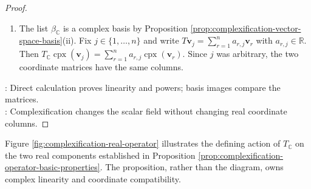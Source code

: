 \begin{proposition}
\begin{proof}
\begin{enumerate}[label=(\roman*)]
Hence $(\forall\,k\in\mathbb{Z}_{\geq0})\,(T_{\mathbb{C}})^k(\mathbf{u}+i\mathbf{v})=T^k\mathbf{u}+iT^k\mathbf{v}$ by induction. Since $\mathbf{u},\mathbf{v}$ were arbitrary, claim (ii) follows.
\item The list $\beta_{\mathbb{C}}$ is a complex basis by Proposition \ref{prop:complexification-vector-space-basis}(ii). Fix $j\in\{1,\ldots,n\}$ and write $T\mathbf{v}_j=\sum\limits_{r=1}^{n}a_{r,j}\mathbf{v}_r$ with $a_{r,j}\in\mathbb{R}$.\\
Then $T_{\mathbb{C}}\operatorname{cpx}(\mathbf{v}_j)=\sum\limits_{r=1}^{n}a_{r,j}\operatorname{cpx}(\mathbf{v}_r)$. Since $j$ was arbitrary, the two coordinate matrices have the same columns.
\end{enumerate}
: Direct calculation proves linearity and powers; basis images compare the matrices.\\
: Complexification changes the scalar field without changing real coordinate columns.
\end{proof}
\end{proposition}

Figure \ref{fig:complexification-real-operator} illustrates the defining action of $T_{\mathbb{C}}$ on the two real components established in Proposition \ref{prop:complexification-operator-basic-properties}. The proposition, rather than the diagram, owns complex linearity and coordinate compatibility.

\begin{illustrationfigure}[H]
  \centering
  
  \caption{Complexification packages two real vectors: $T_{\mathbb{C}}(\mathbf{u}+i\mathbf{v})=T\mathbf{u}+iT\mathbf{v}$.}
  \label{fig:complexification-real-operator}
\end{illustrationfigure}

